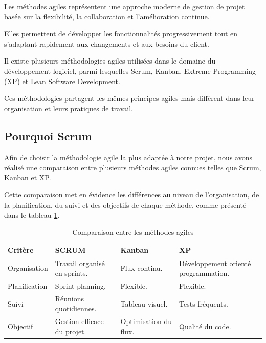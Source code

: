 Les méthodes agiles représentent une approche moderne de gestion de projet basée sur la flexibilité, la collaboration et l’amélioration continue.

Elles permettent de développer les fonctionnalités progressivement tout en s’adaptant rapidement aux changements et aux besoins du client.

Il existe plusieurs méthodologies agiles utilisées dans le domaine du développement logiciel, parmi lesquelles Scrum, Kanban, Extreme Programming (XP) et Lean Software Development.

Ces méthodologies partagent les mêmes principes agiles mais diffèrent dans leur organisation et leurs pratiques de travail.

\subsection{Pourquoi Scrum}

Afin de choisir la méthodologie agile la plus adaptée à notre projet, nous avons réalisé une comparaison entre plusieurs méthodes agiles connues telles que Scrum, Kanban et XP.

Cette comparaison met en évidence les différences au niveau de l’organisation, de la planification, du suivi et des objectifs de chaque méthode, comme présenté dans le tableau \ref{tab:methodes_agiles}.

\begin{table}[H]
	\centering
	\renewcommand{\arraystretch}{1.5}
	
	\begin{tabularx}{\textwidth}{|p{3cm}|X|X|X|}
		\hline
		
		\rowcolor{green!20}
		\textbf{Critère} &
		\textbf{SCRUM} &
		\textbf{Kanban} &
		\textbf{XP}
		\\ \hline
		
		Organisation &
		Travail organisé en sprints. &
		Flux continu. &
		Développement orienté programmation.
		\\ \hline
		
		Planification &
		Sprint planning. &
		Flexible. &
		Flexible.
		\\ \hline
		
		Suivi &
		Réunions quotidiennes. &
		Tableau visuel. &
		Tests fréquents.
		\\ \hline
		
		Objectif &
		Gestion efficace du projet. &
		Optimisation du flux. &
		Qualité du code.
		\\ \hline
		
	\end{tabularx}
	
	\caption{Comparaison entre les méthodes agiles}
	\label{tab:methodes_agiles}
	
\end{table}


